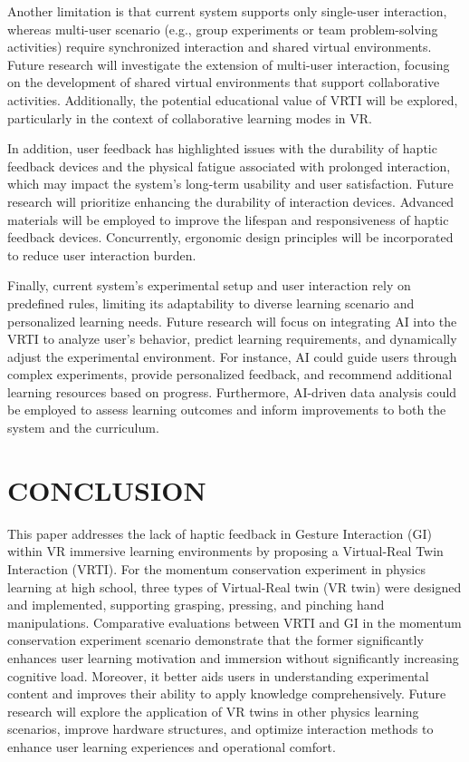 \documentclass[runningheads]{llncs}
\begin{document}
Another limitation is that current system supports only single-user interaction, whereas multi-user scenario (e.g., group experiments or team problem-solving activities) require synchronized interaction and shared virtual environments. Future research will investigate the extension of multi-user interaction, focusing on the development of shared virtual environments that support collaborative activities. Additionally, the potential educational value of VRTI will be explored, particularly in the context of collaborative learning modes in VR.

In addition, user feedback has highlighted issues with the durability of haptic feedback devices and the physical fatigue associated with prolonged interaction, which may impact the system's long-term usability and user satisfaction. Future research will prioritize enhancing the durability of interaction devices. Advanced materials will be employed to improve the lifespan and responsiveness of haptic feedback devices. Concurrently, ergonomic design principles will be incorporated to reduce user interaction burden.

Finally, current system's experimental setup and user interaction rely on predefined rules, limiting its adaptability to diverse learning scenario and personalized learning needs. Future research will focus on integrating AI into the VRTI to analyze user's behavior, predict learning requirements, and dynamically adjust the experimental environment. For instance, AI could guide users through complex experiments, provide personalized feedback, and recommend additional learning resources based on progress. Furthermore, AI-driven data analysis could be employed to assess learning outcomes and inform improvements to both the system and the curriculum.

\section{CONCLUSION}
This paper addresses the lack of haptic feedback in Gesture Interaction (GI) within VR immersive learning environments by proposing a Virtual-Real Twin Interaction (VRTI). For the momentum conservation experiment in physics learning at high school, three types of Virtual-Real twin (VR twin) were designed and implemented, supporting grasping, pressing, and pinching hand manipulations. Comparative evaluations between VRTI and GI in the momentum conservation experiment scenario demonstrate that the former significantly enhances user learning motivation and immersion without significantly increasing cognitive load. Moreover, it better aids users in understanding experimental content and improves their ability to apply knowledge comprehensively. Future research will explore the application of VR twins in other physics learning scenarios, improve hardware structures, and optimize interaction methods to enhance user learning experiences and operational comfort.
\end{document}
